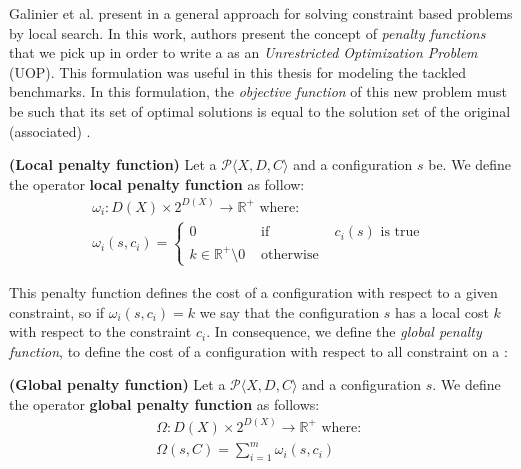 Galinier et al. present in \cite{Galinier04} a general approach for solving constraint based problems by local search. In this work, authors present the concept of {\it penalty functions} that we pick up in order to write a \csp{} as an \textit{Unrestricted Optimization Problem} (UOP). This formulation was useful in this thesis for modeling the tackled benchmarks. In this formulation, the \textit{objective function} of this new problem must be such that its set of optimal solutions is equal to the solution set of the original (associated) \csp.

\begin{definition}{\bf (Local penalty function)}
\label{def:local_cost}
Let a {\bf \csp} $\mathcal{P}\langle X,D,C \rangle$ and a configuration $s$ be. We define the operator {\bf local penalty function} as follow: 
\begin{equation*}
\begin{array}{l}
	\omega_i:D\left(X\right)\times 2^{D\left(X\right)}\rightarrow\mathbb{R}^+\text{ where: }\\
	\omega_i\left(s,c_i\right)=\left\{
	\begin{array}{lll}
	0 & \text{ if } & c_i(s)\text{ is true }\\
	k \in \mathbb{R}^+ \setminus {0} & \text{ otherwise } &
	\end{array}
	\right.
\end{array}
\end{equation*}
\end{definition}

This penalty function defines the cost of a configuration with respect to a given constraint, so if $\omega_i\left(s,c_i\right)=k$ we say that the configuration $s$ has a local cost $k$ with respect to the constraint $c_i$. In consequence, we define the \textit{global penalty function}, to define the cost of a configuration with respect to all constraint on a \csp:

\begin{definition}{\bf (Global penalty function)}
\label{def:global_cost}
Let a {\bf \csp} $\mathcal{P}\langle X,D,C \rangle$ and a configuration $s$. We define the operator {\bf global penalty function} as follows: 
\begin{equation*}
\begin{array}{l}
\Omega:D\left(X\right)\times 2^{D\left(X\right)}\rightarrow\mathbb{R}^+ \text{ where: }\\
\Omega\left(s,C\right)=\displaystyle\sum_{i=1}^{m}{\omega_i\left(s,c_i\right)}
\end{array}
\end{equation*}
\end{definition}

